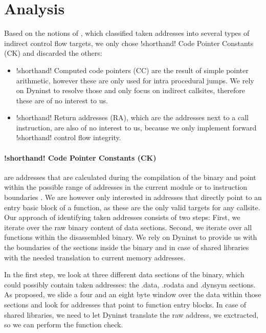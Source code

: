 \section{Analysis}
Based on the notions of \cite{ZhangSekar00}, which classified taken addresses into several types of indirect control flow targets, we only chose {!shorthand! Code Pointer Constants (CK)} and discarded the others:
\begin{itemize}
\item {!shorthand! Computed code pointers (CC)} are the result of simple pointer arithmetic, however these are only used for intra procedural jumps\cite{ZhangSekar00}. We rely on Dyninst to resolve those and only focus on indirect callsites, therefore these are of no interest to us.
\item {!shorthand! Return addresses (RA)}, which are the addresses next to a call instruction, are also of no interest to us, because we only implement forward {!shorthand! control flow integrity}.
\end{itemize}


\paragraph{!shorthand! Code Pointer Constants (CK)} are addresses that are calculated during the compilation of the binary and point within the possible range of addresses in the current module or to instruction boundaries \cite{ZhangSekar00}. We are however only interested in addresses that directly point to an entry basic block of a function, as these are the only valid targets for any callsite.\\

Our approach of identifying taken addresses consists of two steps: First, we iterate over the raw binary content of data sections. Second, we iterate over all functions within the disassembled binary. We rely on Dyninst to provide us with the boundaries of the sections inside the binary and in case of shared libraries with the needed translation to current memory addresses.

In the first step, we look at three different data sections of the binary, which could possibly contain taken addresses: the .data, .rodata and .dynsym sections. As \cite{ZhangSekar00} proposed, we slide a four and an eight byte window over the data within those sections and look for addresses that point to function entry blocks. In case of shared libraries, we need to let Dyninst translate the raw address, we exctracted, so we can perform the function check.

